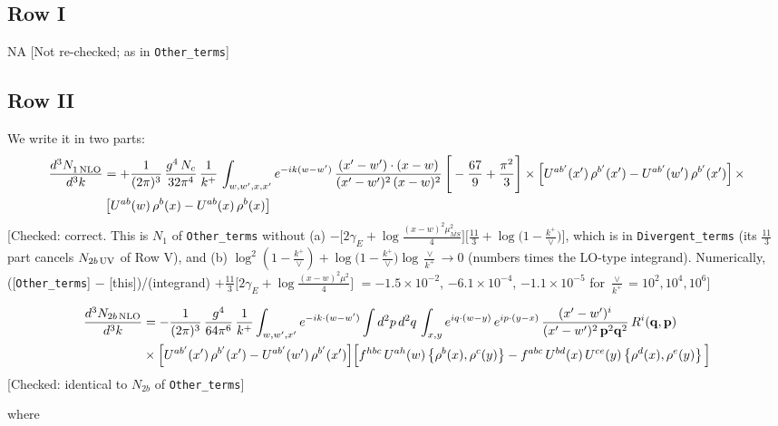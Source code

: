\documentclass[9pt]{article}
\numberwithin{equation}{section}
\begin{document}
\subsection{Row I}
\textsc{NA} {\color{red}[Not re-checked; as in \texttt{Other\_terms}]}
\subsection{Row II}
We write it in two parts:
\begin{align}
     \frac{d^{3}N_{1\,\rm NLO}^{\rm}}{d^{3}k} &  =  +\frac{1}{(2\pi)^{3}}\, \frac{g^{4}\,N_{c}}{32\pi^{4}}\,\frac{1}{k^{+}}\, \int_{w, w',x,x'} e^{-ik(w-w^\prime)}\, \frac{(x'-w')\cdot (x-w)}{(x'-w')^{2}\, (x-w)^{2}}\, \Bigg[ -\frac{67}{9}+\frac{\pi^{2}}{3}\Bigg]\times \left[U^{ab'}(x')\,\rho^{b'}(x') - U^{ab'}(w')\,\rho^{b'}(x')\right]\times\notag \\ & \left[U^{ab}(w)\,\rho^{b}(x) - U^{ab}(x)\,\rho^{b}(x)\right]
\end{align} {\color{red}[Checked: correct. This is $N_{1}$ of \texttt{Other\_terms} without (a) $-\big[2\gamma_{E}+\log\frac{(x-w)^{2}\mu^{2}_{\overline{MS}}}{4}\big]\big[\frac{11}{3}+\log\big(1-\frac{k^{+}}{\vee}\big)\big]$, which is in \texttt{Divergent\_terms} (its $\frac{11}{3}$ part cancels $N_{2b\,\rm UV}$ of Row V), and (b) $\log^{2}(1-\frac{k^{+}}{\vee})+\log\big(1-\frac{k^{+}}{\vee}\big)\log\frac{\vee}{k^{+}}\to0$ (numbers times the LO-type integrand). Numerically, ([\texttt{Other\_terms}] $-$ [this])/(integrand) $+\frac{11}{3}\big[2\gamma_{E}+\log\frac{(x-w)^{2}\mu^{2}}{4}\big]$ $=-1.5\times10^{-2}$, $-6.1\times10^{-4}$, $-1.1\times10^{-5}$ for $\frac{\vee}{k^{+}}=10^{2},10^{4},10^{6}$]}\par\noindent
\begin{align}
\frac{d^{3}N_{2b\,\rm NLO}}{d^{3}k} & = -\frac{1}{(2\pi)^{3}}\,\frac{g^{4}}{64\pi^{6}}\,\frac{1}{k^{+}}\int_{w,w',x'} e^{-ik\cdot(w-w')}
\int d^{2}p\,d^{2}q\,\int_{x,y} e^{iq\cdot(w-y)}\,e^{ip\cdot(y-x)}\,\frac{(x'-w')^{i}}{(x'-w')^{2}\,\mathbf{p}^{2}\mathbf{q}^{2}}\,R^{i}(\mathbf{q},\mathbf{p})\notag\\
&\times\Big[U^{ab'}(x')\,\rho^{b'}(x')-U^{ab'}(w')\,\rho^{b'}(x')\Big]
\Big[f^{hbc}\,U^{ah}(w)\left\{\rho^{b}(x),\rho^{c}(y)\right\}-f^{abc}\,U^{bd}(x)\,U^{ce}(y)\left\{\rho^{d}(x),\rho^{e}(y)\right\}\Big]
\end{align} {\color{red}[Checked: identical to $N_{2b}$ of \texttt{Other\_terms}]}\par\noindent
where
\end{document}

